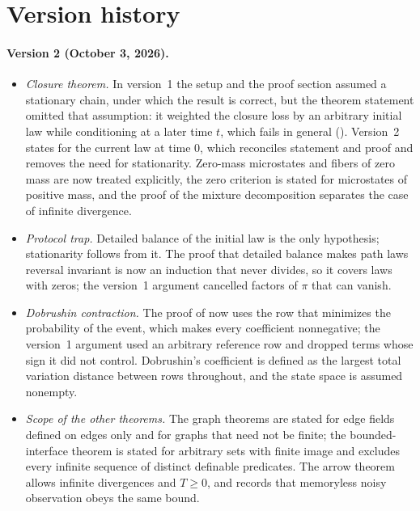 \section{Version history}\label{app:versions}

\paragraph{Version 2 (October 3, 2026).}
\begin{itemize}[leftmargin=*]
  \item \emph{Closure theorem.} In version~1 the setup and the proof section assumed a stationary chain, under which the result is correct, but the theorem statement omitted that assumption: it weighted the closure loss by an arbitrary initial law while conditioning at a later time $t$, which fails in general (). Version~2 states \thmNGMacroClosureDeficit{} for the current law at time $0$, which reconciles statement and proof and removes the need for stationarity. Zero-mass microstates and fibers of zero mass are now treated explicitly, the zero criterion is stated for microstates of positive mass, and the proof of the mixture decomposition separates the case of infinite divergence.
  \item \emph{Protocol trap.} Detailed balance of the initial law is the only hypothesis; stationarity follows from it. The proof that detailed balance makes path laws reversal invariant is now an induction that never divides, so it covers laws with zeros; the version~1 argument cancelled factors of $\pi$ that can vanish.
  \item \emph{Dobrushin contraction.} The proof of  now uses the row that minimizes the probability of the event, which makes every coefficient nonnegative; the version~1 argument used an arbitrary reference row and dropped terms whose sign it did not control. Dobrushin's coefficient is defined as the largest total variation distance between rows throughout, and the state space is assumed nonempty.
  \item \emph{Scope of the other theorems.} The graph theorems are stated for edge fields defined on edges only and for graphs that need not be finite; the bounded-interface theorem is stated for arbitrary sets with finite image and excludes every infinite sequence of distinct definable predicates. The arrow theorem allows infinite divergences and $T\ge 0$, and  records that memoryless noisy observation obeys the same bound.

\end{itemize}
